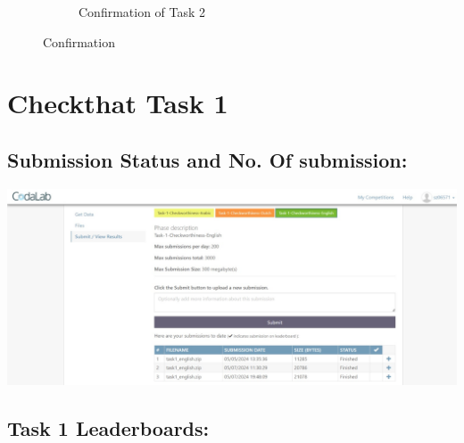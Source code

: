 \documentclass{article}
\begin{document}
\begin{figure}[h!]
\begin{subfigure}[b]{0.45\textwidth}
        \caption{Confirmation of Task 2}
        \label{fig:img2}
    \end{subfigure}
    \caption{Confirmation}
    \label{fig:combined}
\end{figure}

\section{\textcolor{sectioncolor}{Checkthat Task 1}}

\subsection{Submission Status and No. Of submission:}
\includegraphics[width=15cm]{Task1_Status.jpg}

\subsection{Task 1 Leaderboards:}
\end{document}
